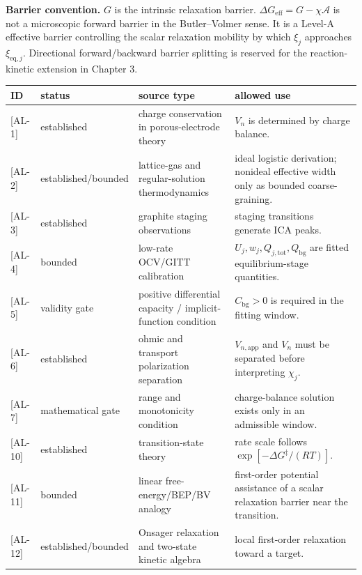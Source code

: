 \documentclass[11pt,a4paper]{article}
\newcommand{\eff}{\mathrm{eff}}
\newcommand{\eq}{\mathrm{eq}}
\newcommand{\app}{\mathrm{app}}
\newcommand{\bg}{\mathrm{bg}}
\newcommand{\tot}{\mathrm{tot}}
\newcommand{\AL}[1]{\textsf{[AL-#1]}}
\begin{document}
\textbf{Barrier convention.} $G$ is the intrinsic relaxation barrier. $\Delta G_{\eff}=G-\chi\mathcal A$ is not a microscopic forward barrier
in the Butler--Volmer sense. It is a Level-A effective barrier controlling the scalar relaxation mobility by which $\xi_j$ approaches
$\xi_{\eq,j}$. Directional forward/backward barrier splitting is reserved for the reaction-kinetic extension in Chapter 3.

\begin{longtable}{p{} p{} p{} p{}}
\toprule ID & status & source type & allowed use \\ \midrule \endhead
\AL{1} & established & charge conservation in porous-electrode theory \cite{doyle1993,newman} & $V_n$ is determined by charge balance. \\
\AL{2} & established/bounded & lattice-gas and regular-solution thermodynamics \cite{mckinnon1983,bazant2013} & ideal logistic derivation; nonideal effective width only as bounded coarse-graining. \\
\AL{3} & established & graphite staging observations \cite{dahn1991,ohzuku1993,funabiki1999ea,funabiki1999jes} & staging transitions generate ICA peaks. \\
\AL{4} & bounded & low-rate OCV/GITT calibration & $U_j,w_j,Q_{j,\tot},Q_{\bg}$ are fitted equilibrium-stage quantities. \\
\AL{5} & validity gate & positive differential capacity / implicit-function condition \cite{newman,bazant2013} & $C_{\bg}>0$ is required in the fitting window. \\
\AL{6} & established & ohmic and transport polarization separation \cite{newman,bardfaulkner} & $V_{n,\app}$ and $V_n$ must be separated before interpreting $\chi_j$. \\
\AL{7} & mathematical gate & range and monotonicity condition & charge-balance solution exists only in an admissible window. \\
\AL{10} & established & transition-state theory \cite{eyring1935} & rate scale follows $\exp[-\Delta G^\ddagger/(RT)]$. \\
\AL{11} & bounded & linear free-energy/BEP/BV analogy \cite{evanspolanyi1938,bardfaulkner,bazant2013} & first-order potential assistance of a scalar relaxation barrier near the transition. \\
\AL{12} & established/bounded & Onsager relaxation and two-state kinetic algebra \cite{onsager1931,degrootmazur1962} & local first-order relaxation toward a target. \\

\end{longtable}
\end{document}

